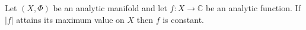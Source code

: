 Let $(X, \Phi)$ be an analytic manifold and let $f: X \to \mathbb{C}$ be an analytic function. If $|f|$ attains its maximum value on $X$ then $f$ is constant.
